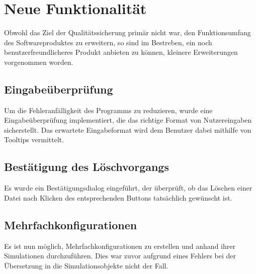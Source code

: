 \section{Neue Funktionalität}

Obwohl das Ziel der Qualitätssicherung primär nicht war, den Funktionsumfang des Softwareproduktes zu erweitern, so sind im Bestreben, ein noch benutzerfreundlicheres Produkt anbieten zu können, kleinere Erweiterungen vorgenommen worden.


\subsection{Eingabeüberprüfung}

Um die Fehleranfälligkeit des Programms zu reduzieren, wurde eine Eingabeüberprüfung implementiert, die das richtige Format von Nutzereingaben sicherstellt. Das erwartete Eingabeformat wird dem Benutzer dabei mithilfe von Tooltips vermittelt.

\subsection{Bestätigung des Löschvorgangs}

Es wurde ein Bestätigungsdialog eingeführt, der überprüft, ob das Löschen einer Datei nach Klicken des entsprechenden Buttons tatsächlich gewünscht ist.

\subsection{Mehrfachkonfigurationen}

Es ist nun möglich, Mehrfachkonfigurationen zu erstellen und anhand ihrer Simulationen durchzuführen.
Dies war zuvor aufgrund eines Fehlers bei der Übersetzung in die Simulationsobjekte nicht der Fall.
